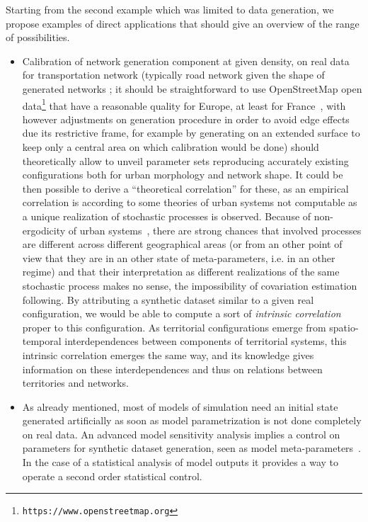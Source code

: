 Starting from the second example which was limited to data generation, we propose examples of direct applications that should give an overview of the range of possibilities.


\begin{itemize}
\item Calibration of network generation component at given density, on real data for transportation network (typically road network given the shape of generated networks ; it should be straightforward to use OpenStreetMap open data\footnote{\texttt{https://www.openstreetmap.org}} that have a reasonable quality for Europe, at least for France~\cite{girres2010quality}, with however adjustments on generation procedure in order to avoid edge effects due its restrictive frame, for example by generating on an extended surface to keep only a central area on which calibration would be done) should theoretically allow to unveil parameter sets reproducing accurately existing configurations both for urban morphology and network shape. It could be then possible to derive a ``theoretical correlation'' for these, as an empirical correlation is according to some theories of urban systems not computable as a unique realization of stochastic processes is observed. Because of non-ergodicity of urban systems~\cite{pumain2012urban}, there are strong chances that involved processes are different across different geographical areas (or from an other point of view that they are in an other state of meta-parameters, i.e. in an other regime) and that their interpretation as different realizations of the same stochastic process makes no sense, the impossibility of covariation estimation following. By attributing a synthetic dataset similar to a given real configuration, we would be able to compute a sort of \emph{intrinsic correlation} proper to this configuration. As territorial configurations emerge from spatio-temporal interdependences between components of territorial systems, this intrinsic correlation emerges the same way, and its knowledge gives information on these interdependences and thus on relations between territories and networks.
\item As already mentioned, most of models of simulation need an initial state generated artificially as soon as model parametrization is not done completely on real data. An advanced model sensitivity analysis implies a control on parameters for synthetic dataset generation, seen as model meta-parameters~\cite{cottineau2015revisiting}. In the case of a statistical analysis of model outputs it provides a way to operate a second order statistical control.

\end{itemize}
